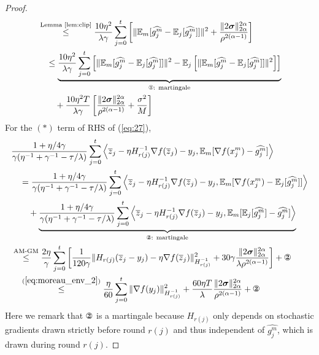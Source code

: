 \documentclass{article} %
\numberwithin{equation}{section}
\newcommand{\cirone}{\text{\ding{172}}}
\newcommand{\cirtwo}{\text{\ding{173}}}
\renewcommand{\eqref}[1]{(\ref{#1})}
\begin{document}
\begin{proof}
\begin{equation}
\begin{aligned}
            &\overset{\text{Lemma \ref{lem:clip}}}{\leq} \frac{10\eta^2}{\lambda\gamma} \sum_{j=0}^t\left[\|\expect_m[\widehat{g_j^m}-\expect_j[\widehat{g_j^m}]]\|^2+\frac{\|2\boldsymbol{\sigma}\|_{2\alpha}^{2\alpha}}{\rho^{2(\alpha-1)}}\right] \\
            &\quad \leq \underbrace{\frac{10\eta^2}{\lambda\gamma} \sum_{j=0}^t\left[\|\expect_m[\widehat{g_j^m}-\expect_j[\widehat{g_j^m}]]\|^2 - \expect_j\left[\|\expect_m[\widehat{g_j^m}-\expect_j[\widehat{g_j^m}]]\|^2\right]\right]}_{\cirone\text{: martingale}} \\
            &\quad\quad + \frac{10\eta^2T}{\lambda\gamma}\left[\frac{\|2\boldsymbol{\sigma}\|_{2\alpha}^{2\alpha}}{\rho^{2(\alpha-1)}}+\frac{\sigma^2}{M}\right]
        \end{aligned}
    \end{equation}
    For the $(*)$ term of RHS of \eqref{eq:27},
    \begin{equation}\label{eq:32}
        \begin{aligned}
            &\frac{1+\eta/4\gamma}{\gamma(\eta^{-1} +\gamma^{-1}-\tau/\lambda)} \sum_{j=0}^t\left\langle \overline{z}_{j}-\eta H_{r(j)}^{-1}\nabla f(\overline{z}_j)-y_j, \expect_m[\nabla f(x_j^m)-\widehat{g_j^m}]\right\rangle \\
            &\quad = \frac{1+\eta/4\gamma}{\gamma(\eta^{-1} +\gamma^{-1}-\tau/\lambda)} \sum_{j=0}^t\left\langle \overline{z}_{j}-\eta H_{r(j)}^{-1}\nabla f(\overline{z}_j)-y_j, \expect_m[\nabla f(x_j^m)-\expect_j[\widehat{g_j^m}]]\right\rangle \\
            &\quad\quad + \underbrace{\frac{1+\eta/4\gamma}{\gamma(\eta^{-1} +\gamma^{-1}-\tau/\lambda)} \sum_{j=0}^t\left\langle \overline{z}_{j}-\eta H_{r(j)}^{-1}\nabla f(\overline{z}_j)-y_j, \expect_m[\expect_j[\widehat{g_j^m}]-\widehat{g_j^m}]\right\rangle}_{\cirtwo\text{: martingale}} \\
            &\overset{\text{AM-GM}}{\leq} \frac{2\eta}{\gamma} \sum_{j=0}^t \left[ \frac{1}{120\gamma}\|H_{r(j)}(\overline{z}_{j}-y_j)-\eta \nabla f(\overline{z}_j)\|_{H_{r(j)}^{-1}}^2+30\gamma\frac{\|2\boldsymbol{\sigma}\|_{2\alpha}^{2\alpha}}{\lambda\rho^{2(\alpha-1)}}\right] + \cirtwo \\
            &\quad \overset{\eqref{eq:moreau_env_2}}{\leq} \frac{\eta}{60}\sum_{j=0}^t\|\nabla f(y_j)\|_{H_{r(j)}^{-1}}^2 + \frac{60\eta T}{\lambda} \frac{\|2\boldsymbol{\sigma}\|_{2\alpha}^{2\alpha}}{\rho^{2(\alpha-1)}} +\cirtwo
        \end{aligned}
    \end{equation}
    Here we remark that $\cirtwo$ is a martingale because $H_{r(j)}$ only depends on stochastic gradients drawn strictly before round $r(j)$ and thus independent of $\widehat{g_j^m}$, which is drawn during round $r(j)$.
    

\end{proof}
\end{document}
